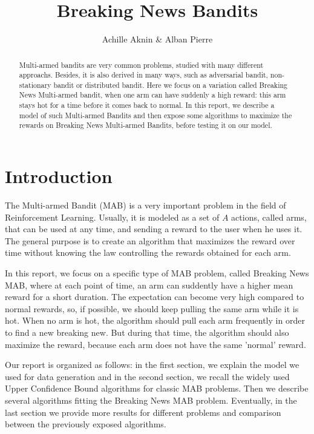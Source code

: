 \documentclass{article} %
\title{Breaking News Bandits}
\author{Achille Aknin \& Alban Pierre}
\begin{document}
\maketitle

\begin{abstract}
Multi-armed bandits are very common problems, studied with many different approachs.
Besides, it is also derived in many ways, such as adversarial bandit, non-stationary bandit or distributed bandit.
Here we focus on a variation called
Breaking News Multi-armed bandit, when one arm can have suddenly a high reward: this arm stays hot for a time before it comes back to normal.
In this report, we describe a model of such Multi-armed Bandits and then expose some algorithms to maximize the rewards
on Breaking News Multi-armed Bandits, before testing it on our model.
\end{abstract}

\section*{Introduction}

The Multi-armed Bandit (MAB) is a very important problem in the field of Reinforcement Learning.
Usually, it is modeled as a set of $A$ actions, called arms, that can be used at any time,
and sending a reward to the user when he uses it. The general purpose is to create an algorithm that
maximizes the reward over time without knowing the law controlling the rewards obtained
for each arm.

In this report, we focus on a specific type of MAB problem, called Breaking News MAB,
where at each point of time, an arm can suddently have a higher mean reward for a short duration. The expectation can become
very high compared to normal rewards, so, if possible, we should keep pulling the same
arm while it is hot. When no arm is hot, the algorithm should pull each arm frequently
in order to find a new breaking new. But during that time, the algorithm should
also maximize the reward, because each arm does not have the same 'normal' reward.

Our report is organized as follows: in the first
section, we explain the model we used for data generation and in the second section, we recall the widely used
Upper Confidence Bound algorithms for classic MAB problems. Then we describe
several algorithms fitting the Breaking News MAB problem.
Eventually, in the last section we provide more results for different problems and comparison between
the previously exposed algorithms.
\newline
\end{document}

